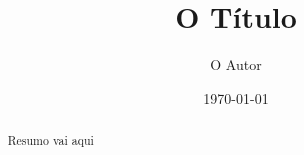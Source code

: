 \documentclass{article}
\title{O Título}
\author{O Autor}
\date{\today}
\begin{document}
\maketitle

\begin{abstract}
Resumo vai aqui
\end{abstract}
\end{document}
